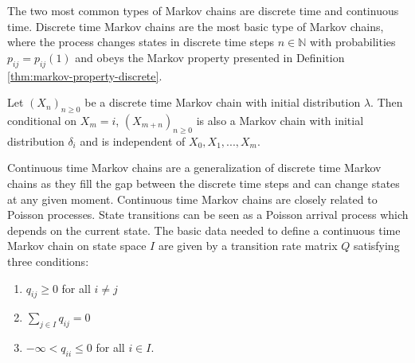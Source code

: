
The two most common types of Markov chains are discrete time and continuous time.
Discrete time Markov chains are the most basic type of Markov chains, where the process
changes states in discrete time steps $n \in \mathbb{N}$ with probabilities $p_{ij} = p_{ij}(1)$
and obeys the Markov property presented in Definition \ref{thm:markov-property-discrete}.

\begin{defn}
\label{thm:markov-property-discrete}
Let $(X_n)_{n \ge 0}$ be a discrete time Markov chain with initial distribution $\lambda$.
Then conditional on $X_m = i$, $(X_{m + n})_{n \ge 0}$ is also a Markov chain with initial
distribution $\delta_i$ and is independent of $X_0, X_1, ..., X_m$.
\end{defn}

Continuous time Markov chains are a generalization of discrete time Markov chains as they
fill the gap between the discrete time steps and can change states at any given moment.
Continuous time Markov chains are closely related to Poisson processes. State transitions can be seen as a Poisson arrival process which depends on the current state. 
%
%
The basic data needed to define a continuous time Markov chain on state space $I$ are
given by a transition rate matrix $Q$ satisfying three conditions:
\begin{enumerate}
	\item $q_{ij} \ge 0$ for all $i \ne j$
	\item $\sum_{j \in I} q_{ij} = 0$
	\item $-\infty < q_{ii} \le 0$ for all $i \in I$.
\end{enumerate}

